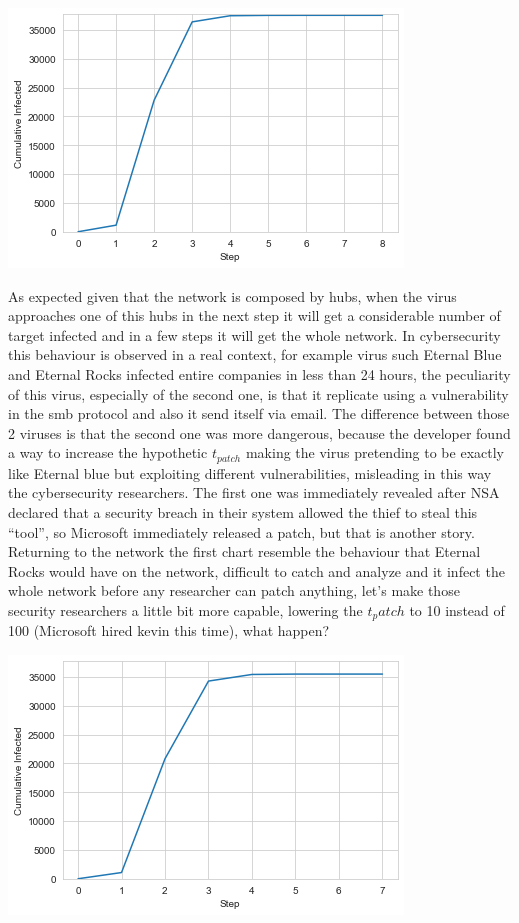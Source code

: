 \documentclass[]{article}
\begin{document}
    \begin{center}
        \includegraphics[scale=0.5]{charts/infection.png}
    \end{center}
    As expected given that the network is composed by hubs, when the virus approaches one of this hubs in the next step it will get a considerable number of target infected and in a few steps it will get the whole network. In cybersecurity this behaviour is observed in a real context, for example virus such Eternal Blue and Eternal Rocks infected entire companies in less than 24 hours, the peculiarity of this virus, especially of the second one, is that it replicate using a vulnerability in the smb protocol and also it send itself via email. The difference between those 2 viruses is that the second one was more dangerous, because the developer found a way to increase the hypothetic $t_{patch}$ making the virus pretending to be exactly like Eternal blue but exploiting different vulnerabilities, misleading in this way the cybersecurity researchers. The first one was immediately revealed after NSA declared that a security breach in their system allowed the thief to steal this ``tool'', so Microsoft immediately released a patch, but that is another story. Returning to the network the first chart resemble the behaviour that Eternal Rocks would have on the network, difficult to catch and analyze and it infect the whole network before any researcher can patch anything, let's make those security researchers a little bit more capable, lowering the $t_patch$ to 10 instead of 100 (Microsoft hired kevin this time), what happen?
    \begin{center}
        \includegraphics[scale=0.5]{charts/infection2.png}
    \end{center}
\end{document}
